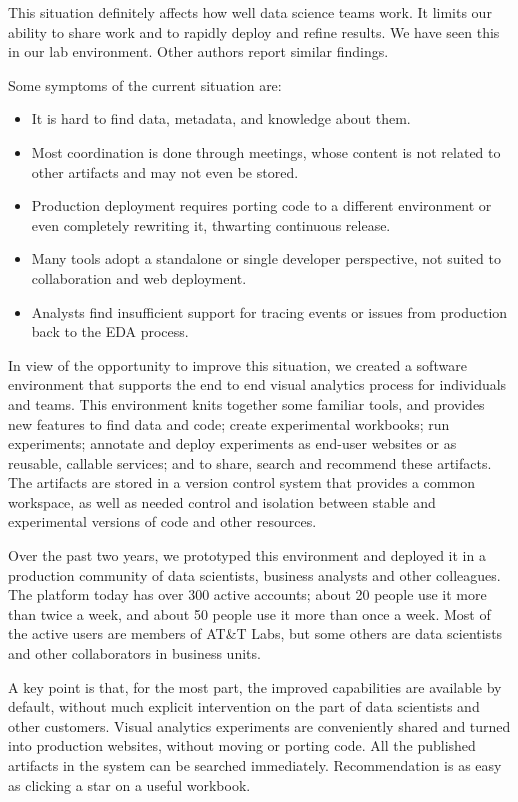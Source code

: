 This situation definitely affects how well data science teams work.
It limits our ability to share work and to rapidly deploy and refine results.
We have seen this in our lab environment.
Other authors report similar findings.

Some symptoms of the current situation are:
\begin{itemize}
\item It is hard to find data, metadata, and knowledge about them.
\item Most coordination is done through meetings, whose content is not related to other artifacts and may not even be stored.
\item Production deployment requires porting code to a different environment or even completely rewriting it, thwarting continuous release.
\item Many tools adopt a standalone or single developer perspective,
not suited to collaboration and web deployment. 
\item Analysts find insufficient support for tracing events or issues from production back to the EDA process.
\end{itemize}

In view of the opportunity to improve this situation,
we created a software environment that supports the end to end
visual analytics process for individuals and teams.
This environment knits together some familiar tools, and 
provides new features to find data and code; create experimental workbooks;
run experiments; annotate and deploy experiments as end-user websites or
as reusable, callable services; and to share, search and recommend these artifacts. The artifacts are stored in a version
control system that provides a common workspace, as well as needed control
and isolation between stable and experimental versions of code and other
resources. 

Over the past two years, we prototyped this environment and deployed it in a
production community of data scientists, business analysts and other colleagues.
The platform today has over 300 active accounts; about 20 people use it more
than twice a week, and about 50 people use it more than once a week.  Most of
the active users are members of AT&T Labs, but some others are data scientists
and other collaborators in business units. 

A key point is that, for the most part, the improved capabilities are
available by default, without much explicit intervention on the part of
data scientists and other customers. Visual analytics experiments are
conveniently shared and turned into production websites, without moving
or porting code. All the published artifacts in the system can be
searched immediately. Recommendation is as easy as clicking a star
on a useful workbook.

